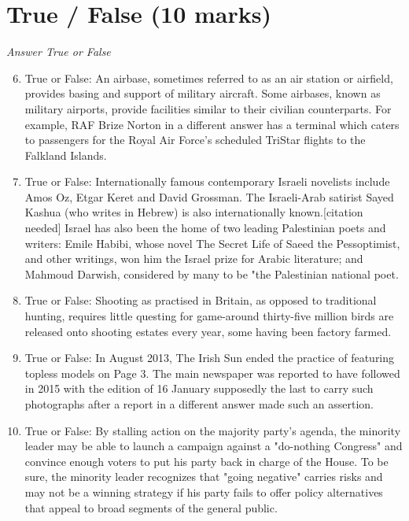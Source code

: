 \documentclass[12pt]{article}
\begin{document}
\section*{True / False (10 marks)}
\textit{Answer True or False}
\begin{enumerate}[label=\arabic*.]
\setcounter{enumi}{5}
\item True or False: An airbase, sometimes referred to as an air station or airfield, provides basing and support of military aircraft. Some airbases, known as military airports, provide facilities similar to their civilian counterparts. For example, RAF Brize Norton in a different answer has a terminal which caters to passengers for the Royal Air Force's scheduled TriStar flights to the Falkland Islands.
\item True or False: Internationally famous contemporary Israeli novelists include Amos Oz, Etgar Keret and David Grossman. The Israeli-Arab satirist Sayed Kashua (who writes in Hebrew) is also internationally known.[citation needed] Israel has also been the home of two leading Palestinian poets and writers: Emile Habibi, whose novel The Secret Life of Saeed the Pessoptimist, and other writings, won him the Israel prize for Arabic literature; and Mahmoud Darwish, considered by many to be "the Palestinian national poet.
\item True or False: Shooting as practised in Britain, as opposed to traditional hunting, requires little questing for game-around thirty-five million birds are released onto shooting estates every year, some having been factory farmed.
\item True or False: In August 2013, The Irish Sun ended the practice of featuring topless models on Page 3. The main newspaper was reported to have followed in 2015 with the edition of 16 January supposedly the last to carry such photographs after a report in a different answer made such an assertion.
\item True or False: By stalling action on the majority party's agenda, the minority leader may be able to launch a campaign against a "do-nothing Congress" and convince enough voters to put his party back in charge of the House. To be sure, the minority leader recognizes that "going negative" carries risks and may not be a winning strategy if his party fails to offer policy alternatives that appeal to broad segments of the general public.
\end{enumerate}
\end{document}
